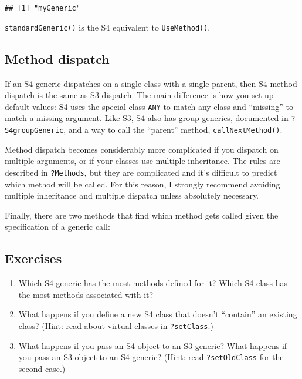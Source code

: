 \begin{verbatim}
## [1] "myGeneric"
\end{verbatim}

\texttt{standardGeneric()} is the S4 equivalent to \texttt{UseMethod()}.

\hypertarget{method-dispatch-1}{%
\subsection{Method dispatch}\label{method-dispatch-1}}

If an S4 generic dispatches on a single class with a single parent, then
S4 method dispatch is the same as S3 dispatch. The main difference is
how you set up default values: S4 uses the special class \texttt{ANY} to
match any class and ``missing'' to match a missing argument. Like S3, S4
also has group generics, documented in \texttt{?S4groupGeneric}, and a
way to call the ``parent'' method, \texttt{callNextMethod()}.

Method dispatch becomes considerably more complicated if you dispatch on
multiple arguments, or if your classes use multiple inheritance. The
rules are described in \texttt{?Methods}, but they are complicated and
it's difficult to predict which method will be called. For this reason,
I strongly recommend avoiding multiple inheritance and multiple dispatch
unless absolutely necessary.

Finally, there are two methods that find which method gets called given
the specification of a generic call:

\begin{Shaded}
\begin{Highlighting}[]
\NormalTok{(}\NormalTok{, }\NormalTok{(}\NormalTok{))}

\NormalTok{(}
\end{Highlighting}
\end{Shaded}

\hypertarget{exercises-1}{%
\subsection{Exercises}\label{exercises-1}}

\begin{enumerate}
\def\labelenumi{\arabic{enumi}.}
\item
  Which S4 generic has the most methods defined for it? Which S4 class
  has the most methods associated with it?
\item
  What happens if you define a new S4 class that doesn't ``contain'' an
  existing class? (Hint: read about virtual classes in
  \texttt{?setClass}.)
\item
  What happens if you pass an S4 object to an S3 generic? What happens
  if you pass an S3 object to an S4 generic? (Hint: read
  \texttt{?setOldClass} for the second case.)
\end{enumerate}


